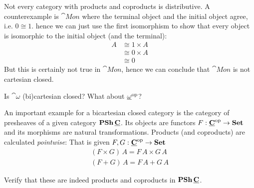 Not every category with products and coproducts is distributive. A counterexample is $\cat{Mon}$ where the terminal object and the initial object agree, i.e. $0 \cong 1$. hence we can just use the first isomorphism to show that every object is isomorphic to the initial object (and the terminal):
\begin{align*}
A & \cong 1 \times A \\
& \cong 0 \times A \\
& \cong 0  
\end{align*}
But this is certainly not true in $\cat{Mon}$, hence we can conclude that $\cat{Mon}$ is not cartesian closed. 

\begin{Exercise}
  Is $\cat{\omega}$ (bi)cartesian closed? What about $\underline{\mathbf{\omega}}^{\mathrm{op}}$?
\end{Exercise}

An important example for a bicartesian closed category is the category of presheaves of a given category $\mathbf{PSh}\,\underline{\mathbf{C}}$. Its objects are functors $F : \underline{\mathbf{C}}^{\mathrm{op}} \to \mathbf{Set}$ and its morphisms are natural transformations. Products (and coproducts) are calculated \emph{pointwise}: That is given $F,G : \underline{\mathbf{C}}^{\mathrm{op}} \to \mathbf{Set}$
\begin{align*}
  (F \times G)\,A = F\,A \times G\,A \\
  (F + G)\, A = F\,A + G\,A
\end{align*}
\begin{Exercise}
  Verify that these are indeed products and coproducts in $\mathbf{PSh}\,\underline{\mathbf{C}}$.
\end{Exercise}

